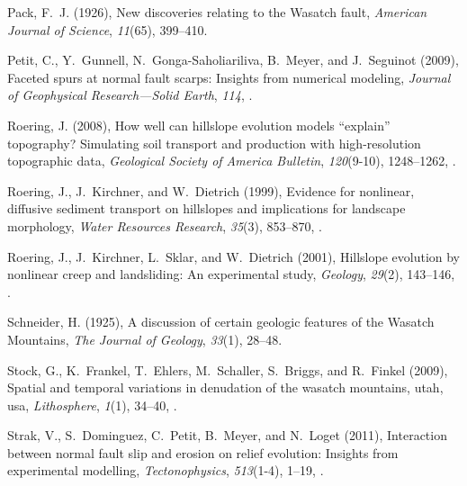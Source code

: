 \begin{thebibliography}{41}
Pack, F.~J. (1926), {New discoveries relating to the Wasatch fault},
  \textit{American Journal of Science}, \textit{11}(65), 399--410.

Petit, C., Y.~Gunnell, N.~Gonga-Saholiariliva, B.~Meyer, and J.~Seguinot
  ({2009}), {Faceted spurs at normal fault scarps: Insights from numerical
  modeling}, \textit{Journal of Geophysical Research---Solid Earth},
  \textit{{114}}, .

Roering, J. (2008), {How well can hillslope evolution models ``explain''
  topography? Simulating soil transport and production with high-resolution
  topographic data}, \textit{Geological Society of America Bulletin},
  \textit{120}(9-10), 1248--1262, .

Roering, J., J.~Kirchner, and W.~Dietrich ({1999}), {Evidence for nonlinear,
  diffusive sediment transport on hillslopes and implications for landscape
  morphology}, \textit{{Water Resources Research}}, \textit{{35}}({3}),
  {853--870}, .

Roering, J., J.~Kirchner, L.~Sklar, and W.~Dietrich ({2001}), {Hillslope
  evolution by nonlinear creep and landsliding: An experimental study},
  \textit{{Geology}}, \textit{{29}}({2}), {143--146},
  .

Schneider, H. (1925), {A discussion of certain geologic features of the Wasatch
  Mountains}, \textit{The Journal of Geology}, \textit{33}(1), 28--48.

Stock, G., K.~Frankel, T.~Ehlers, M.~Schaller, S.~Briggs, and R.~Finkel (2009),
  Spatial and temporal variations in denudation of the wasatch mountains, utah,
  usa, \textit{Lithosphere}, \textit{1}(1), 34--40, .

Strak, V., S.~Dominguez, C.~Petit, B.~Meyer, and N.~Loget (2011), Interaction
  between normal fault slip and erosion on relief evolution: Insights from
  experimental modelling, \textit{Tectonophysics}, \textit{513}(1-4), 1--19,
  .


\end{thebibliography}
